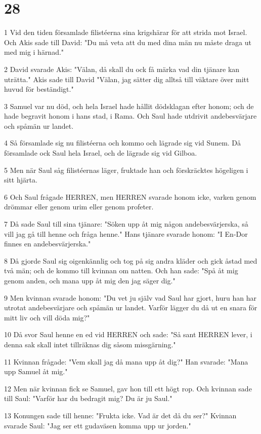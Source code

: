 \chapter{28}

\par 1 Vid den tiden församlade filistéerna sina krigshärar för att strida mot Israel. Och Akis sade till David: "Du må veta att du med dina män nu måste draga ut med mig i härnad."
\par 2 David svarade Akis: "Välan, då skall du ock få märka vad din tjänare kan uträtta." Akis sade till David "Välan, jag sätter dig alltså till väktare över mitt huvud för beständigt."
\par 3 Samuel var nu död, och hela Israel hade hållit dödsklagan efter honom; och de hade begravit honom i hans stad, i Rama. Och Saul hade utdrivit andebesvärjare och spåmän ur landet.
\par 4 Så församlade sig nu filistéerna och kommo och lägrade sig vid Sunem. Då församlade ock Saul hela Israel, och de lägrade sig vid Gilboa.
\par 5 Men när Saul såg filistéernas läger, fruktade han och förskräcktes högeligen i sitt hjärta.
\par 6 Och Saul frågade HERREN, men HERREN svarade honom icke, varken genom drömmar eller genom urim eller genom profeter.
\par 7 Då sade Saul till sina tjänare: "Söken upp åt mig någon andebesvärjerska, så vill jag gå till henne och fråga henne." Hans tjänare svarade honom: "I En-Dor finnes en andebesvärjerska."
\par 8 Då gjorde Saul sig oigenkännlig och tog på sig andra kläder och gick åstad med två män; och de kommo till kvinnan om natten. Och han sade: "Spå åt mig genom anden, och mana upp åt mig den jag säger dig."
\par 9 Men kvinnan svarade honom: "Du vet ju själv vad Saul har gjort, huru han har utrotat andebesvärjare och spåmän ur landet. Varför lägger du då ut en snara för mitt liv och vill döda mig?"
\par 10 Då svor Saul henne en ed vid HERREN och sade: "Så sant HERREN lever, i denna sak skall intet tillräknas dig såsom missgärning."
\par 11 Kvinnan frågade: "Vem skall jag då mana upp åt dig?" Han svarade: "Mana upp Samuel åt mig."
\par 12 Men när kvinnan fick se Samuel, gav hon till ett högt rop. Och kvinnan sade till Saul: "Varför har du bedragit mig? Du är ju Saul."
\par 13 Konungen sade till henne: "Frukta icke. Vad är det då du ser?" Kvinnan svarade Saul: "Jag ser ett gudaväsen komma upp ur jorden."
